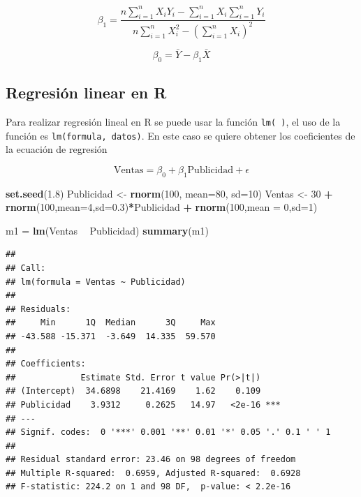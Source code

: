 \documentclass[]{book}
\newenvironment{Shaded}{\begin{snugshade}}{\end{snugshade}}
\newcommand{\DataTypeTok}[1]{\textcolor[rgb]{0.13,0.29,0.53}{#1}}
\newcommand{\DecValTok}[1]{\textcolor[rgb]{0.00,0.00,0.81}{#1}}
\newcommand{\FloatTok}[1]{\textcolor[rgb]{0.00,0.00,0.81}{#1}}
\newcommand{\KeywordTok}[1]{\textcolor[rgb]{0.13,0.29,0.53}{\textbf{#1}}}
\newcommand{\NormalTok}[1]{#1}
\newcommand{\OperatorTok}[1]{\textcolor[rgb]{0.81,0.36,0.00}{\textbf{#1}}}
\newcommand{\StringTok}[1]{\textcolor[rgb]{0.31,0.60,0.02}{#1}}
\begin{document}
\begin{equation}
\beta_1 = \dfrac{n\sum_{i=1}^{n}{X_iY_i}-\sum_{i=1}^{n}{X_i}\sum_{i=1}^{n}{Y_i}}{n\sum_{i=1}^{n}{X_i^2}-\left(\sum_{i=1}^{n}{X_i}\right)^2}
    \label{eq:pendiente}
\end{equation}

\begin{equation}
\beta_0 = \bar{Y}-\beta_1\bar{X}
    \label{eq:inter}
\end{equation}

\hypertarget{regresion-linear-en-r}{%
\subsection{Regresión linear en R}\label{regresion-linear-en-r}}

Para realizar regresión lineal en R se puede usar la función \texttt{lm(\ )}, el uso de la función es \texttt{lm(formula,\ datos)}. En este caso se quiere obtener los coeficientes de la ecuación de regresión

\begin{equation}
  \text{Ventas} = \beta_0 + \beta_1 \text{Publicidad} + \epsilon
    \label{eq:modelo0}
\end{equation}

\begin{Shaded}
\begin{Highlighting}[]
\KeywordTok{set.seed}\NormalTok{(}\FloatTok{1.8}\NormalTok{)}
\NormalTok{Publicidad <-}\StringTok{ }\KeywordTok{rnorm}\NormalTok{(}\DecValTok{100}\NormalTok{, }\DataTypeTok{mean=}\DecValTok{80}\NormalTok{, }\DataTypeTok{sd=}\DecValTok{10}\NormalTok{)}
\NormalTok{Ventas <-}\StringTok{ }\DecValTok{30} \OperatorTok{+}\StringTok{ }\KeywordTok{rnorm}\NormalTok{(}\DecValTok{100}\NormalTok{,}\DataTypeTok{mean=}\DecValTok{4}\NormalTok{,}\DataTypeTok{sd=}\FloatTok{0.3}\NormalTok{)}\OperatorTok{*}\NormalTok{Publicidad }\OperatorTok{+}\StringTok{ }\KeywordTok{rnorm}\NormalTok{(}\DecValTok{100}\NormalTok{,}\DataTypeTok{mean =} \DecValTok{0}\NormalTok{,}\DataTypeTok{sd=}\DecValTok{1}\NormalTok{)}

\NormalTok{m1 =}\StringTok{ }\KeywordTok{lm}\NormalTok{(Ventas }\OperatorTok{~}\StringTok{ }\NormalTok{Publicidad)}
\KeywordTok{summary}\NormalTok{(m1)}
\end{Highlighting}
\end{Shaded}

\begin{verbatim}
## 
## Call:
## lm(formula = Ventas ~ Publicidad)
## 
## Residuals:
##     Min      1Q  Median      3Q     Max 
## -43.588 -15.371  -3.649  14.335  59.570 
## 
## Coefficients:
##             Estimate Std. Error t value Pr(>|t|)    
## (Intercept)  34.6898    21.4169    1.62    0.109    
## Publicidad    3.9312     0.2625   14.97   <2e-16 ***
## ---
## Signif. codes:  0 '***' 0.001 '**' 0.01 '*' 0.05 '.' 0.1 ' ' 1
## 
## Residual standard error: 23.46 on 98 degrees of freedom
## Multiple R-squared:  0.6959, Adjusted R-squared:  0.6928 
## F-statistic: 224.2 on 1 and 98 DF,  p-value: < 2.2e-16
\end{verbatim}
\end{document}
